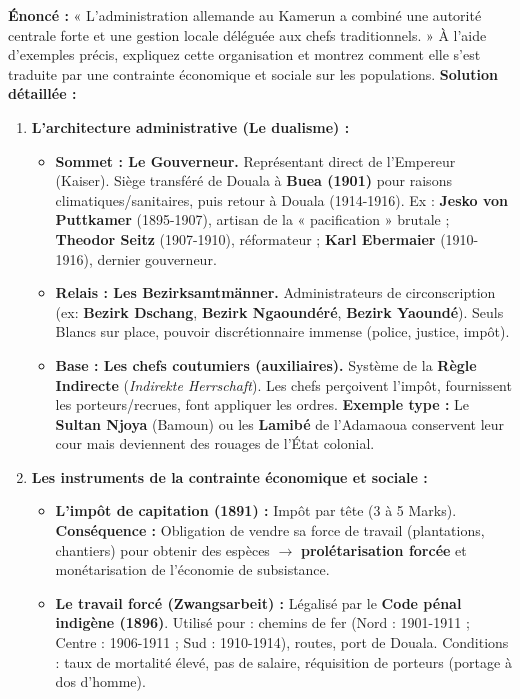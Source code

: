 \documentclass[11pt]{article}
\begin{document}
\begin{exoresolu}
\textbf{Énoncé :} « L'administration allemande au Kamerun a combiné une autorité centrale forte et une gestion locale déléguée aux chefs traditionnels. » À l'aide d'exemples précis, expliquez cette organisation et montrez comment elle s'est traduite par une contrainte économique et sociale sur les populations.
\tcblower
\textbf{Solution détaillée :}
\begin{enumerate}
    \item \textbf{L'architecture administrative (Le dualisme) :}
    \begin{itemize}
        \item \textbf{Sommet : Le Gouverneur.} Représentant direct de l'Empereur (Kaiser). Siège transféré de Douala à \textbf{Buea (1901)} pour raisons climatiques/sanitaires, puis retour à Douala (1914-1916). Ex : \textbf{Jesko von Puttkamer} (1895-1907), artisan de la « pacification » brutale ; \textbf{Theodor Seitz} (1907-1910), réformateur ; \textbf{Karl Ebermaier} (1910-1916), dernier gouverneur.
        \item \textbf{Relais : Les Bezirksamtmänner.} Administrateurs de circonscription (ex: \textbf{Bezirk Dschang}, \textbf{Bezirk Ngaoundéré}, \textbf{Bezirk Yaoundé}). Seuls Blancs sur place, pouvoir discrétionnaire immense (police, justice, impôt).
        \item \textbf{Base : Les chefs coutumiers (auxiliaires).} Système de la \textbf{Règle Indirecte} (\emph{Indirekte Herrschaft}). Les chefs perçoivent l'impôt, fournissent les porteurs/recrues, font appliquer les ordres. \textbf{Exemple type :} Le \textbf{Sultan Njoya} (Bamoun) ou les \textbf{Lamibé} de l'Adamaoua conservent leur cour mais deviennent des rouages de l'État colonial.
    \end{itemize}
    \item \textbf{Les instruments de la contrainte économique et sociale :}
    \begin{itemize}
        \item \textbf{L'impôt de capitation (1891) :} Impôt par tête (3 à 5 Marks). \textbf{Conséquence :} Obligation de vendre sa force de travail (plantations, chantiers) pour obtenir des espèces $\rightarrow$ \textbf{prolétarisation forcée} et monétarisation de l'économie de subsistance.
        \item \textbf{Le travail forcé (Zwangsarbeit) :} Légalisé par le \textbf{Code pénal indigène (1896)}. Utilisé pour : chemins de fer (Nord : 1901-1911 ; Centre : 1906-1911 ; Sud : 1910-1914), routes, port de Douala. Conditions : taux de mortalité élevé, pas de salaire, réquisition de porteurs (portage à dos d'homme).

\end{itemize}
\end{enumerate}
\end{exoresolu}
\end{document}
